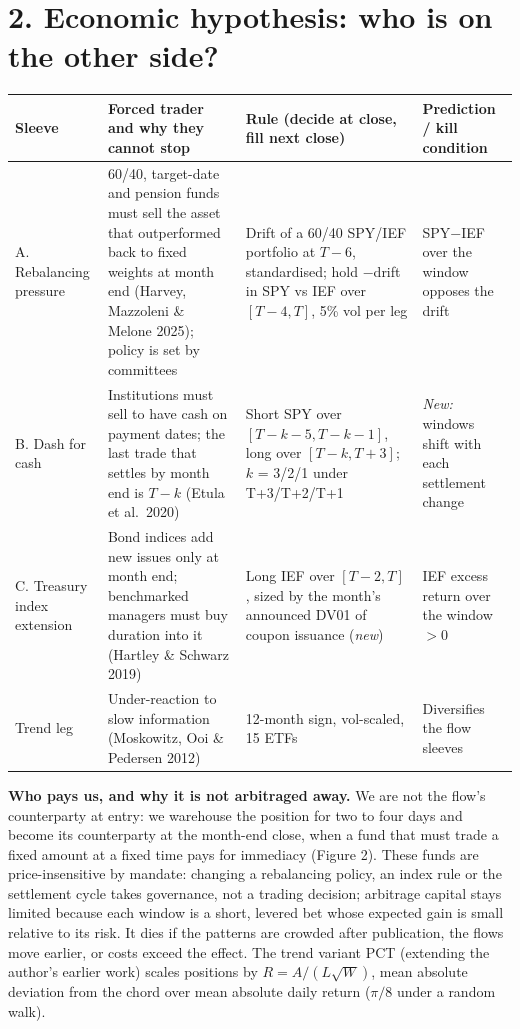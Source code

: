 \documentclass[11pt]{article}
\newcommand{\sect}[1]{\vspace{1pt}\section*{#1}\vspace{-4pt}}
\begin{document}
\sect{2. Economic hypothesis: who is on the other side?}
\vspace{-2pt}
\begin{table}[h]\centering\small
\begin{tabular}{@{}p{1.95cm}p{4.95cm}p{4.15cm}p{3.95cm}@{}}
\toprule
Sleeve & Forced trader and why they cannot stop & Rule (decide at close, fill next close) & Prediction / kill condition\\
\midrule
A. Rebalancing pressure & 60/40, target-date and pension funds must sell the asset that outperformed back to fixed weights at month end (Harvey, Mazzoleni \& Melone 2025); policy is set by committees & Drift of a 60/40 SPY/IEF portfolio at $T{-}6$, standardised; hold $-$drift in SPY vs IEF over $[T{-}4,T]$, 5\% vol per leg & SPY$-$IEF over the window opposes the drift\\
B. Dash for cash & Institutions must sell to have cash on payment dates; the last trade that settles by month end is $T{-}k$ (Etula et al.\ 2020) & Short SPY over $[T{-}k{-}5,T{-}k{-}1]$, long over $[T{-}k,T{+}3]$; $k$ = 3/2/1 under T+3/T+2/T+1 & \emph{New:} windows shift with each settlement change\\
C. Treasury index extension & Bond indices add new issues only at month end; benchmarked managers must buy duration into it (Hartley \& Schwarz 2019) & Long IEF over $[T{-}2,T]$, sized by the month's announced DV01 of coupon issuance (\emph{new}) & IEF excess return over the window $>0$\\
Trend leg & Under-reaction to slow information (Moskowitz, Ooi \& Pedersen 2012) & 12-month sign, vol-scaled, 15 ETFs & Diversifies the flow sleeves\\
\bottomrule
\end{tabular}
\vspace{-4pt}
\end{table}

\textbf{Who pays us, and why it is not arbitraged away.} We are not the flow's counterparty at entry: we warehouse the position for two to four days and become its counterparty at the month-end close, when a fund that must trade a fixed amount at a fixed time pays for immediacy (Figure 2). These funds are price-insensitive by mandate: changing a rebalancing policy, an index rule or the settlement cycle takes governance, not a trading decision; arbitrage capital stays limited because each window is a short, levered bet whose expected gain is small relative to its risk. It dies if the patterns are crowded after publication, the flows move earlier, or costs exceed the effect. The trend variant PCT (extending the author's earlier work) scales positions by $R = A/(L\sqrt{W})$, mean absolute deviation from the chord over mean absolute daily return ($\pi/8$ under a random walk).
\end{document}
